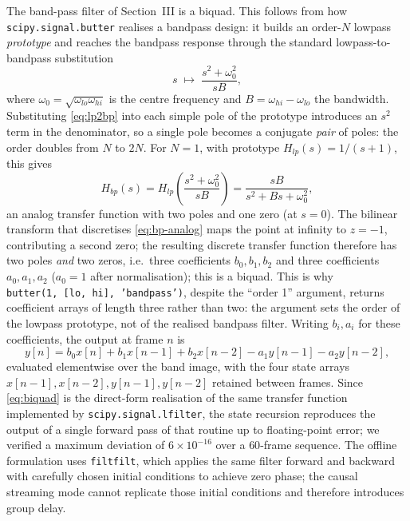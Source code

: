 \documentclass[conference]{IEEEtran}
\begin{document}
The band-pass filter of Section~III is a biquad. This follows from how
\texttt{scipy.signal.butter} realises a bandpass design: it builds an
order-$N$ lowpass \emph{prototype} and reaches the bandpass response through
the standard lowpass-to-bandpass substitution
\begin{equation}
s \;\longmapsto\; \frac{s^2+\omega_0^2}{sB},
\label{eq:lp2bp}
\end{equation}
where $\omega_0=\sqrt{\omega_{lo}\omega_{hi}}$ is the centre frequency and
$B=\omega_{hi}-\omega_{lo}$ the bandwidth. Substituting \eqref{eq:lp2bp} into
each simple pole of the prototype introduces an $s^2$ term in the
denominator, so a single pole becomes a conjugate \emph{pair} of poles: the
order doubles from $N$ to $2N$. For $N=1$, with prototype
$H_{lp}(s)=1/(s+1)$, this gives
\begin{equation}
H_{bp}(s) = H_{lp}\!\left(\frac{s^2+\omega_0^2}{sB}\right)
          = \frac{sB}{s^2+Bs+\omega_0^2},
\label{eq:bp-analog}
\end{equation}
an analog transfer function with two poles and one zero (at $s=0$). The
bilinear transform that discretises \eqref{eq:bp-analog} maps the point at
infinity to $z=-1$, contributing a second zero; the resulting discrete
transfer function therefore has two poles \emph{and} two zeros, i.e.\ three
coefficients $b_0,b_1,b_2$ and three coefficients $a_0,a_1,a_2$ ($a_0=1$
after normalisation); this is a biquad. This is why
\texttt{butter(1,~[lo,~hi],~'bandpass')}, despite the ``order 1'' argument,
returns coefficient arrays of length three rather than two: the argument
sets the order of the lowpass prototype, not of the realised bandpass
filter. Writing $b_i, a_i$ for these
coefficients, the output at frame $n$ is
\begin{equation}
y[n] = b_0 x[n] + b_1 x[n{-}1] + b_2 x[n{-}2] - a_1 y[n{-}1] - a_2 y[n{-}2],
\label{eq:biquad}
\end{equation}
evaluated elementwise over the band image, with the four state arrays
$x[n{-}1], x[n{-}2], y[n{-}1], y[n{-}2]$ retained between frames. Since
\eqref{eq:biquad} is the direct-form realisation of the same transfer function
implemented by \texttt{scipy.signal.lfilter}, the state recursion reproduces the
output of a single forward pass of that routine up to floating-point error; we
verified a maximum deviation of $6\times10^{-16}$ over a $60$-frame sequence.
The offline formulation uses \texttt{filtfilt}, which applies the same filter
forward and backward with carefully chosen initial conditions to achieve zero
phase; the causal streaming mode cannot replicate those initial conditions and
therefore introduces group delay.
\end{document}
